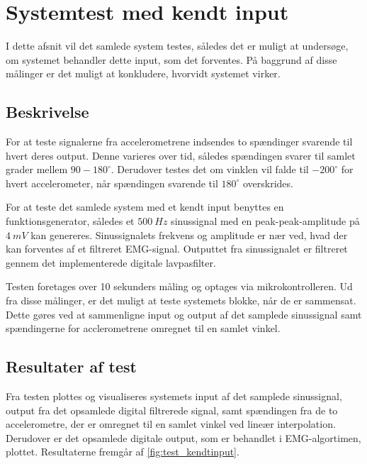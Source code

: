 \section{Systemtest med kendt input} \label{sec:test_kendtinput}
I dette afsnit vil det samlede system testes, således det er muligt at undersøge, om systemet behandler dette input, som det forventes. På baggrund af disse målinger er det muligt at konkludere, hvorvidt systemet virker. 

\subsection{Beskrivelse}
For at teste signalerne fra accelerometrene indsendes to spændinger svarende til hvert deres output. Denne varieres over tid, således spændingen svarer til samlet grader mellem $90-180^{\circ}$. Derudover testes det om vinklen vil falde til $-200^{\circ}$ for hvert accelerometer, når spændingen svarende til $180^{\circ}$ overskrides. 

For at teste det samlede system med et kendt input benyttes en funktionsgenerator, således et $500~Hz$ sinussignal med en peak-peak-amplitude på $4~mV$ kan genereres. Sinussignalets frekvens og amplitude er nær ved, hvad der kan forventes af et filtreret EMG-signal. Outputtet fra sinussignalet er filtreret gennem det implementerede digitale lavpasfilter. 

Testen foretages over 10 sekunders måling og optages via mikrokontrolleren. Ud fra disse målinger, er det muligt at teste systemets blokke, når de er sammensat. Dette gøres ved at sammenligne input og output af det samplede sinussignal samt spændingerne for acclerometrene omregnet til en samlet vinkel.


\subsection{Resultater af test}
Fra testen plottes og visualiseres systemets input af det samplede sinussignal, output fra det opsamlede digital filtrerede signal, samt spændingen fra de to accelerometre, der er omregnet til en samlet vinkel ved lineær interpolation. Derudover er det opsamlede digitale output, som er behandlet i EMG-algortimen, plottet. Resultaterne fremgår af \autoref{fig:test_kendtinput}. 

